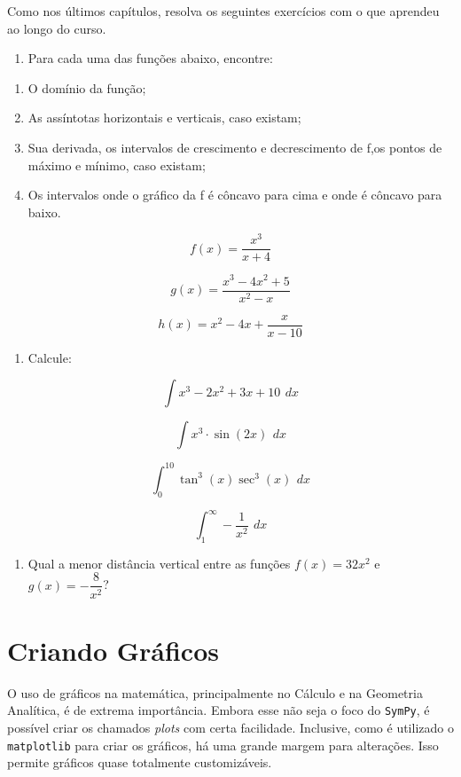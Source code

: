 \documentclass[11pt, brazilian]{article}
\providecommand{\tightlist}{%
      \setlength{\itemsep}{0pt}\setlength{\parskip}{0pt}}
\begin{document}
Como nos últimos capítulos, resolva os seguintes exercícios com o que
aprendeu ao longo do curso.

\begin{enumerate}
\def\labelenumi{\arabic{enumi}.}
\tightlist
\item
  Para cada uma das funções abaixo, encontre:
\end{enumerate}

\begin{enumerate}
\def\labelenumi{\alph{enumi})}
\item
  O domínio da função;
\item
  As assíntotas horizontais e verticais, caso existam;
\item
  Sua derivada, os intervalos de crescimento e decrescimento de f,os
  pontos de máximo e mínimo, caso existam;
\item
  Os intervalos onde o gráfico da f é côncavo para cima e onde é côncavo
  para baixo.
\end{enumerate}

\[f(x) = \dfrac{x^3}{x + 4}\]

\[g(x) = \dfrac{x^3 - 4x^2 + 5}{x^2 - x}\]

\[h(x) = x^2 - 4x + \dfrac{x}{x-10}\]

\begin{enumerate}
\def\labelenumi{\arabic{enumi}.}
\setcounter{enumi}{1}
\tightlist
\item
  Calcule:
\end{enumerate}

\[\int x^3 - 2x^2 + 3x + 10 \,\ dx\]

\[\int x^3\cdot\sin(2x) \,\ dx\]

\[\int_0^{10} \tan^3(x)\sec^3(x) \,\ dx \]

\[\int_1^{\infty} -\dfrac{1}{x^2} \,\ dx \]

\begin{enumerate}
\def\labelenumi{\arabic{enumi}.}
\setcounter{enumi}{2}
\tightlist
\item
  Qual a menor distância vertical entre as funções \(f(x) = 32x^2\) e
  \(g(x) = -\dfrac{8}{x^2}\)?
\end{enumerate}

    \hypertarget{criando-gruxe1ficos}{%
\section{Criando Gráficos}\label{criando-gruxe1ficos}}

O uso de gráficos na matemática, principalmente no Cálculo e na
Geometria Analítica, é de extrema importância. Embora esse não seja o
foco do \texttt{SymPy}, é possível criar os chamados \emph{plots} com
certa facilidade. Inclusive, como é utilizado o \texttt{matplotlib} para
criar os gráficos, há uma grande margem para alterações. Isso permite
gráficos quase totalmente customizáveis.
\end{document}
